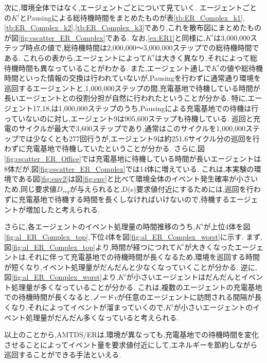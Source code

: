 \documentclass[12pt,a4j,twoside]{jarticle}
\begin{document}
  \par
  次に,環境全体ではなく,エージェントごとについて見ていく.
  エージェントごとの$K^i$とPausingによる総待機時間をまとめたものが表\ref{tb:ER_Complex_k1},\ref{tb:ER_Complex_k2},\ref{tb:ER_Complex_k3}であり,これを散布図にまとめたものが図\ref{fig:cscatter_ER_Complex}である.
  なお,\ref{ex:ER1}と同様に,$K^i$は3,000,000ステップ時点の値で,総待機時間は2,000,000～3,000,000ステップでの総待機時間である.
  これらの表から,エージェントによって$K^i$は大きく異なり,それによって総待機時間も異なっていることがわかる.
  また,エージェント通しで$K^i$の値や総待機時間といった情報の交換は行われていないが,Pausingを行わずに通常通り環境を巡回するエージェントと,1,000,000ステップの間,充電基地で待機している時間が長いエージェントとの役割分担が自然に行われたということが分かる.
  特に,エージェント17,18,は1,000,000ステップのうち,Pausingによる充電基地での待機は行っていないのに対し,エージェント9は905,600ステップも待機している.
  巡回と充電のサイクルが最大で3,600ステップであり,通常はこのサイクルを1,000,000ステップでは少なくとも277回行うが,エージェント9は約251.6サイクル分の巡回を行わずに充電基地で待機していたということが分かる.
  さらに,図\ref{fig:cscatter_ER_Office}では充電基地に待機している時間が長いエージェントは8体だが,図\ref{fig:cscatter_ER_Complex}では14体に増えている.
  これは,本実験の環境である図\ref{fig:env2}は図\ref{fig:env}と比べて環境全体のイベント発生確率が小さいため,同じ要求値$D_{req}$が与えられると,D(s)要求値付近にするためには,巡回を行わずに充電基地で待機する時間を長くしなければいけないので,待機するエージェントが増加したと考えられる.
  
  \par
  さらに,各エージェントのイベント処理量の時間推移のうち,$K^i$が上位4体を図\ref{fig:al_ER_Complex_top},下位4体を図\ref{fig:al_ER_Complex_worst}に示す.
  まず,図\ref{fig:al_ER_Complex_top}より,時間が経つにつれて$K^i$が大きくなったエージェントは,それに伴って充電基地での待機時間が長くなるため,環境を巡回する時間が短くなり,イベント処理量がだんだんと少なくなっていくことが分かる.
  逆に,図\ref{fig:al_ER_Complex_worst}より,$K^i$が小さいエージェントはだんだんとイベント処理量が多くなっていることが分かる.
  これは,複数のエージェントの充電基地での待機時間が長くなると,ノード$v$が任意のエージェントに訪問される間隔が長くなり,それによってイベントが溜まっていくので,$K^i$が小さいエージェントのイベント処理量がだんだん多くなっていると考えられる.

  \par
  以上のことから,AMTDS/ERは,環境が異なっても,充電基地での待機時間を変化させることによってイベント量を要求値付近にして,エネルギーを節約しながら巡回することができる手法といえる.
\end{document}
